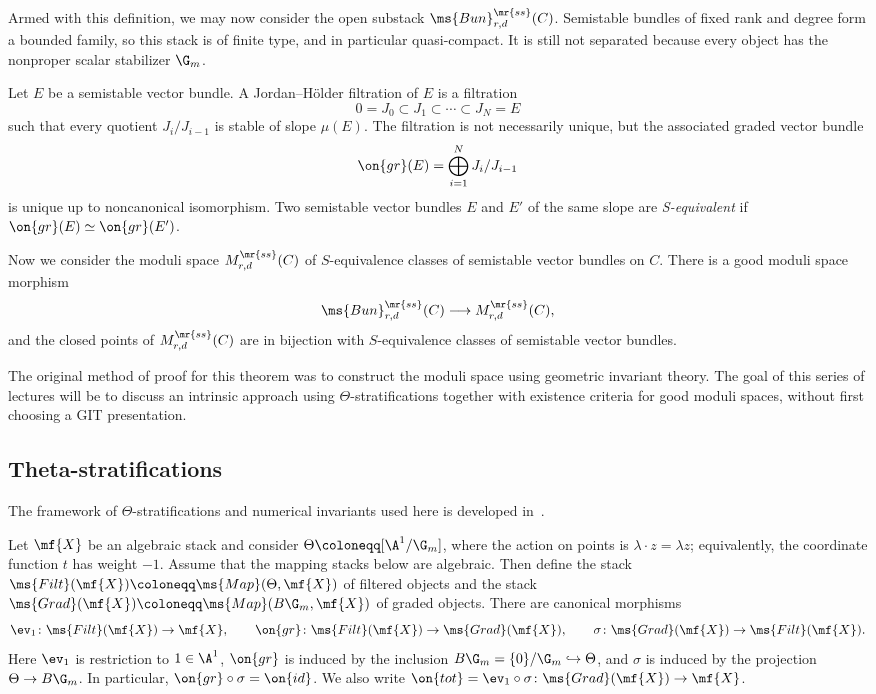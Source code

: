 Armed with this definition, we may now consider the open substack \(\ms{Bun}_{r,d}^{\mr{ss}}(C)\). Semistable bundles of fixed rank and degree form a bounded family, so this stack is of finite type, and in particular quasi-compact. It is still not separated because every object has the nonproper scalar stabilizer \(\G_m\).

\begin{defn}[S-equivalence]
    Let \(E\) be a semistable vector bundle. A Jordan--H\"older filtration of \(E\) is a filtration
    \[ 0=J_0\subset J_1\subset\cdots\subset J_N=E \]
    such that every quotient \(J_i/J_{i-1}\) is stable of slope \(\mu(E)\). The filtration is not necessarily unique, but the associated graded vector bundle
    \[
        \on{gr}(E)=\bigoplus_{i=1}^N J_i/J_{i-1}
    \]
    is unique up to noncanonical isomorphism. Two semistable vector bundles \(E\) and \(E'\) of the same slope are \textit{S-equivalent} if \(\on{gr}(E)\simeq\on{gr}(E')\).
\end{defn}

Now we consider the moduli space \(M_{r,d}^{\mr{ss}}(C)\) of \(S\)-equivalence classes of semistable vector bundles on \(C\). There is a good moduli space morphism
\[
    \ms{Bun}_{r,d}^{\mr{ss}}(C)\longrightarrow M_{r,d}^{\mr{ss}}(C),
\]
and the closed points of \(M_{r,d}^{\mr{ss}}(C)\) are in bijection with \(S\)-equivalence classes of semistable vector bundles.

\begin{rmk}
    The original method of proof for this theorem was to construct the moduli space using geometric invariant theory. The goal of this series of lectures will be to discuss an intrinsic approach using \(\Theta\)-stratifications together with existence criteria for good moduli spaces, without first choosing a GIT presentation.
\end{rmk}


\subsection{Theta-stratifications}%
\label{sub:Theta-stratifications}

The framework of \(\Theta\)-stratifications and numerical invariants used here is developed in~\cite{HLinstability}.

Let \(\mf{X}\) be an algebraic stack and consider \(\Theta\coloneqq[\A^1/\G_m]\), where the action on points is \(\lambda\cdot z=\lambda z\); equivalently, the coordinate function \(t\) has weight \(-1\). Assume that the mapping stacks below are algebraic. Then define the stack \(\ms{Filt}(\mf{X})\coloneqq\ms{Map}(\Theta,\mf{X})\) of filtered objects and the stack \(\ms{Grad}(\mf{X})\coloneqq\ms{Map}(B\G_m,\mf{X})\) of graded objects. There are canonical morphisms
\[
    \ev_1\colon\ms{Filt}(\mf{X})\to\mf{X},
    \qquad
    \on{gr}\colon\ms{Filt}(\mf{X})\to\ms{Grad}(\mf{X}),
    \qquad
    \sigma\colon\ms{Grad}(\mf{X})\to\ms{Filt}(\mf{X}).
\]
Here \(\ev_1\) is restriction to \(1\in\A^1\), \(\on{gr}\) is induced by the inclusion \(B\G_m=\{0\}/\G_m\hookrightarrow\Theta\), and \(\sigma\) is induced by the projection \(\Theta\to B\G_m\). In particular, \(\on{gr}\circ\sigma=\on{id}\). We also write \(\on{tot}=\ev_1\circ\sigma\colon\ms{Grad}(\mf{X})\to\mf{X}\).

